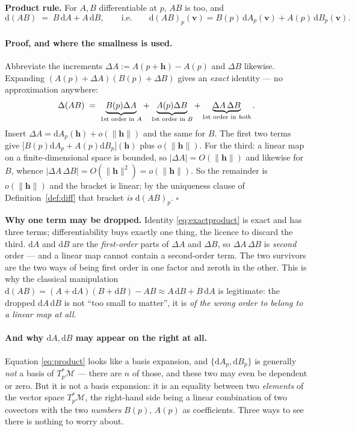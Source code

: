 \documentclass[10pt,a4paper]{article}
\newcommand{\dd}{\mathrm{d}}
\newcommand{\M}{\mathcal{M}}
\newcommand{\vv}{\mathbf{v}}
\newcommand{\hh}{\mathbf{h}}
\theoremstyle{plain}
\theoremstyle{definition}
\numberwithin{equation}{section}
\begin{document}
\begin{keybox}
\textbf{Product rule.} For $A,B$ differentiable at $p$, $AB$ is too, and
\begin{equation}
\dd(AB)\;=\;B\,\dd A+A\,\dd B ,
\qquad\text{i.e.}\qquad
\dd(AB)_p(\vv)=B(p)\,\dd A_p(\vv)+A(p)\,\dd B_p(\vv).
\label{eq:product}
\end{equation}
\end{keybox}

\paragraph{Proof, and where the smallness is used.} Abbreviate the increments
$\Delta A:=A(p+\hh)-A(p)$ and $\Delta B$ likewise. Expanding
$(A(p)+\Delta A)(B(p)+\Delta B)$ gives an \emph{exact} identity --- no approximation anywhere:
\begin{equation}
\Delta(AB)\;=\;\underbrace{B(p)\Delta A}_{\text{1st order in }A}
+\underbrace{A(p)\Delta B}_{\text{1st order in }B}
+\underbrace{\Delta A\,\Delta B}_{\text{1st order in \emph{both}}} .
\label{eq:exactproduct}
\end{equation}
Insert $\Delta A=\dd A_p(\hh)+o(\|\hh\|)$ and the same for $B$. The first two terms give
$\big[B(p)\dd A_p+A(p)\dd B_p\big](\hh)$ plus $o(\|\hh\|)$. For the third: a linear map on a
finite-dimensional space is bounded, so $|\Delta A|=O(\|\hh\|)$ and likewise for $B$, whence
$|\Delta A\,\Delta B|=O(\|\hh\|^2)=o(\|\hh\|)$. So the remainder is $o(\|\hh\|)$ and the bracket
is linear; by the uniqueness clause of Definition~\ref{def:diff} that bracket \emph{is}
$\dd(AB)_p$. \hfill$\square$

\begin{keybox}
\textbf{Why one term may be dropped.} Identity \eqref{eq:exactproduct} is exact and has three
terms; differentiability buys exactly one thing, the licence to discard the third. $\dd A$ and
$\dd B$ are the \emph{first-order} parts of $\Delta A$ and $\Delta B$, so $\Delta A\,\Delta B$
is \emph{second} order --- and a linear map cannot contain a second-order term. The two
survivors are the two ways of being first order in one factor and zeroth in the other. This is
why the classical manipulation
$\dd(AB)=(A+\dd A)(B+\dd B)-AB\approx A\,\dd B+B\,\dd A$ is legitimate: the dropped
$\dd A\,\dd B$ is not ``too small to matter'', it is \emph{of the wrong order to belong to a
linear map at all}.
\end{keybox}

\paragraph{And why $\dd A,\dd B$ may appear on the right at all.} Equation \eqref{eq:product}
looks like a basis expansion, and $\{\dd A_p,\dd B_p\}$ is generally \emph{not} a basis of
$T_p^*\M$ --- there are $n$ of those, and these two may even be dependent or zero. But it is
not a basis expansion: it is an equality between two \emph{elements} of the vector space
$T_p^*\M$, the right-hand side being a linear combination of two covectors with the two
\emph{numbers} $B(p)$, $A(p)$ as coefficients. Three ways to see there is nothing to worry
about.
\end{document}
